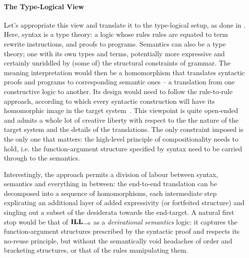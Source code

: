 \paragraph{The Type-Logical View}
Let's appropriate this view and translate it to the type-logical setup, as done in \citet{van1988semantics}.
Here, syntax is a type theory: a logic whose rules rules are equated to term rewrite instructions, and proofs to programs.
Semantics can also be a type theory; one with its own types and terms, potentially more expressive and certainly unriddled by (some of) the structural constraints of grammar.
The meaning interpretation would then be a homomorphism that translates syntactic proofs and programs to corresponding semantic ones -- a translation from one constructive logic to another.
Its design would need to follow the rule-to-rule approach, according to which every syntactic construction will have its homomorphic image in the target system~\cite{bach1976extension}.
This viewpoint is quite open-ended and admits a whole lot of creative liberty with respect to the the nature of the target system and the details of the translations.
The only constraint imposed is the only one that matters: the high-level principle of compositionality needs to hold, i.e. the function-argument structure specified by syntax need to be carried through to the semantics.

Interestingly, the approach permits a division of labour between syntax, semantics and everything in between: the end-to-end translation can be decomposed into a sequence of homomorphisms, each intermediate step explicating an additional layer of added expressivity (or fortfeited structure) and singling out a subset of the desiderata towards the end-target.
A natural first stop would be that of $\ILL_{\li}$ as a \textit{derivational semantics} logic: it captures the function-argument structures prescribed by the syntactic proof and respects its no-reuse principle, but without the semantically void headaches of order and bracketing structures, or that of the rules manipulating them. 
\begin{center}
\end{center}

